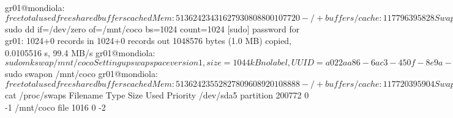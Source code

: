
\begin{envCodigo}
gr01@mondiola:~$ free
             total       used       free     shared    buffers     cached
Mem:        513624     234316     279308          0       8800     107720
-/+ buffers/cache:     117796     395828
Swap:       200772          0     200772
gr01@mondiola:~$ sudo dd if=/dev/zero of=/mnt/coco bs=1024 count=1024
[sudo] password for gr01: 
1024+0 records in
1024+0 records out
1048576 bytes (1.0 MB) copied, 0.0105516 s, 99.4 MB/s
gr01@mondiola:~$ sudo mkswap /mnt/coco 
Setting up swapspace version 1, size = 1044 kB
no label, UUID=a022aa86-6ac3-450f-8e9a-107066e46c46
gr01@mondiola:~$ sudo swapon /mnt/coco 
gr01@mondiola:~$ free
             total       used       free     shared    buffers     cached
Mem:        513624     235528     278096          0       8920     108888
-/+ buffers/cache:     117720     395904
Swap:       201788          0     201788

gr01@mondiola:~$ cat /proc/swaps 
Filename				Type		Size	Used	Priority
/dev/sda5                               partition	200772	0	-1
/mnt/coco                               file		1016	0	-2
\end{envCodigo}

